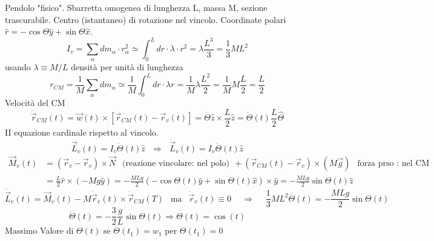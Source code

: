 \begin{example}
    Pendolo "fisico". Sbarretta omogenea di lunghezza L, massa M, sezione trascurabile. Centro (istantaneo) di rotazione nel vincolo.
    Coordinate polari $\hat{r} = -\cos\Theta\hat{y} + \sin\Theta\hat{x}$. 
    $$I_v = \sum_{\alpha}dm_{\alpha} \cdot r_{\alpha}^2 \simeq  \int_{0}^{L}dr \cdot \lambda \cdot r^2 = \lambda \frac{L^3}{3} = \frac{1}{3}ML^2$$
    usando $\lambda \equiv M/L$ densità per unità di lunghezza
    $$r_{CM} = \frac{1}{M}\sum_{\alpha}dm_{\alpha} \simeq \frac{1}{M} \int_{0}^{L} dr \cdot \lambda r = \frac{1}{M}\lambda \frac{L^2}{2} = \frac{1}{M}M \frac{L}{2} = \frac{L}{2}$$
    Velocità del CM
    $$\dot{\vec{r}}_{CM}(t) = \vec{w}(t) \times [\vec{r}_{CM}(t) - \vec{r}_v(t)] = \dot{\Theta}\hat{z} \times \frac{L}{2}\hat{z} = \dot{\Theta}(t) \frac{L}{2}\hat{\Theta}$$
    II equazione cardinale rispetto al vincolo.
    $$\vec{L}_v(t) = I_v\dot{\Theta}(t)\hat{z}\:\:\: \Rightarrow \:\:\: \dot{\vec{L}}_v(t) = I_v\ddot{\Theta}(t)\hat{z}$$
    \begin{equation*}
        \begin{split}
            \vec{M}_v(t) & = (\vec{r}_v - \vec{r}_v) \times \vec{N} \:\:\text{ (reazione vincolare: nel polo)}\:\: + (\vec{r}_{CM}(t) - \vec{r}_v) \times (M\vec{g}) \:\:\text{ forza prso : nel CM}\:\:\\
                         & = \frac{L}{2}\hat{r} \times (-Mg\hat{y}) = -\frac{MLg}{2}(-\cos\Theta(t)\hat{y} + \sin\Theta(t)\hat{x}) \times \hat{y} = -\frac{MLg}{2}\sin\Theta(t)\hat{z}
        \end{split}
    \end{equation*}
    $$\dot{\vec{L}}_v(t) = \vec{M}_v(t) - M\dot{\vec{r}}_v(t) \times \dot{\vec{r}}_{CM}(T) \:\:\text{ ma }\:\: \dot{\vec{r}}_v(t) \equiv 0 \hspace{15pt} \Rightarrow \hspace{15pt}\frac{1}{3}ML^2\ddot{\Theta}(t) = -\frac{MLg}{2}\sin\Theta(t)$$
    $$\ddot{\Theta}(t) = -\frac{3}{2}\frac{g}{L} \sin\Theta(t) \Rightarrow \Theta(t) = \cos(t)$$
    Massimo Valore di $\Theta(t)$ se $\dot{\Theta}(t_1) = w_1$ per $\Theta(t_1) = 0$
    \begin{figure}[h!]
        \centering
        \begin{subfigure}{.20\textwidth}
            \centering

\end{subfigure}
\end{figure}
\end{example}
